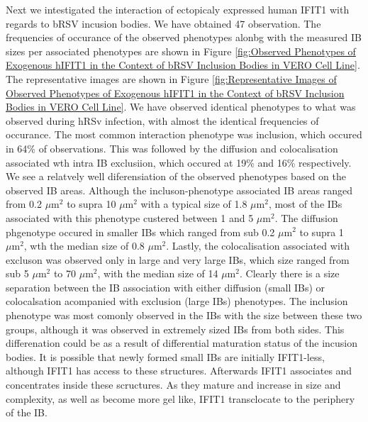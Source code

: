 Next we intestigated the interaction of ectopicaly expressed human IFIT1 with regards to bRSV incusion bodies. We have obtained 47 observation. The frequencies of occurance of the observed phenotypes alonbg with the measured IB sizes per associated phenotypes are shown in Figure \ref{fig:Observed Phenotypes of Exogenous hIFIT1 in the Context of bRSV Inclusion Bodies in VERO Cell Line}. The representative images are shown in Figure \ref{fig:Representative Images of Observed Phenotypes of Exogenous hIFIT1 in the Context of bRSV Inclusion Bodies in VERO Cell Line}. We have observed identical phenotypes to what was observed during hRSv infection, with almost the identical frequencies of occurance. The most common interaction phenotype was inclusion, which occured in 64\% of observations. This was followed by the diffusion and colocalisation associated wth intra IB exclusiion, which occured at 19\% and 16\% respectively. We see a relatvely well diferensiation of the observed phenotypes based on the observed IB areas. Although the incluson-phenotype associated IB areas ranged from 0.2 \(\mu \mbox{m}^2\) to supra 10 \(\mu \mbox{m}^2\) with a typical size of 1.8 \(\mu \mbox{m}^2\), most of the IBs associated with this phenotype custered between 1 and 5 \(\mu \mbox{m}^2\). The diffusion phgenotype occured in smaller IBs which ranged from sub 0.2 \(\mu \mbox{m}^2\) to supra 1 \(\mu \mbox{m}^2\), wth the median size of 0.8 \(\mu \mbox{m}^2\). Lastly, the colocalisation associated with excluson was observed only in large and very large IBs, which size ranged from sub 5 \(\mu \mbox{m}^2\) to 70 \(\mu \mbox{m}^2\), with the median size of 14 \(\mu \mbox{m}^2\). Clearly there is a size separation between the IB association with either diffusion (small IBs) or colocalsation acompanied with exclusion (large IBs) phenotypes. The inclusion phenotype was most comonly observed in the IBs with the size between these two groups, although it was observed in extremely sized IBs from both sides. This differenation could be as a result of differential maturation status of the incusion bodies. It is possible that newly formed small IBs are initially IFIT1-less, although IFIT1 has access to these structures. Afterwards IFIT1 associates and concentrates inside these scructures. As they mature and increase in size and complexity, as well as become more gel like, IFIT1 transclocate to the periphery of the IB.

